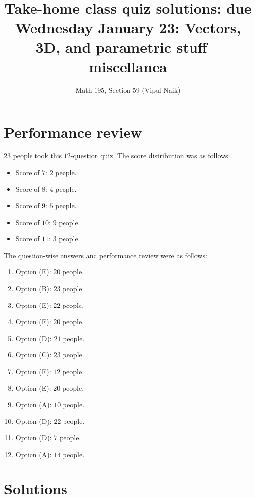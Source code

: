 \documentclass[10pt]{amsart}
\title{Take-home class quiz solutions: due Wednesday January 23: Vectors, 3D, and parametric stuff -- miscellanea}
\author{Math 195, Section 59 (Vipul Naik)}
\begin{document}
\maketitle

\section{Performance review}

$23$ people took this $12$-question quiz. The score distribution was
as follows:

\begin{itemize}
\item Score of $7$: $2$ people.
\item Score of $8$: $4$ people.
\item Score of $9$: $5$ people.
\item Score of $10$: $9$ people.
\item Score of $11$: $3$ people.
\end{itemize}

The question-wise answers and performance review were as follows:

\begin{enumerate}
\item Option (E): $20$ people.
\item Option (B): $23$ people.
\item Option (E): $22$ people.
\item Option (E): $20$ people.
\item Option (D): $21$ people.
\item Option (C): $23$ people.
\item Option (E): $12$ people.
\item Option (E): $20$ people.
\item Option (A): $10$ people.
\item Option (D): $22$ people.
\item Option (D): $7$ people.
\item Option (A): $14$ people.
\end{enumerate}

\section{Solutions}
\end{document}
